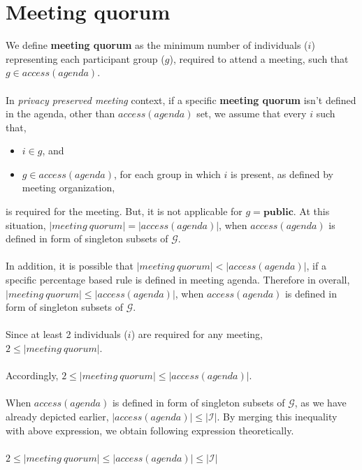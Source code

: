 \documentclass{article}
\begin{document}
\section{Meeting quorum}
\noindent
We define \textbf{meeting quorum} as the minimum number of individuals ($i$) representing each participant group ($g$), required to attend a meeting, such that $g \in access(agenda)$. \\ \\
In \textit{privacy preserved meeting} context, if a specific \textbf{meeting quorum} isn't defined in the agenda, other than $access(agenda)$ set, we assume that every $i$ such that, 
\begin{itemize}
    \item $i \in g$, and
    \item $g \in access(agenda)$, for each group in which $i$ is present, as defined by meeting organization,
\end{itemize}
\noindent
is required for the meeting. But, it is not applicable for $g = \textbf{public}$. At this situation, $|meeting\ quorum| = |access(agenda)|$, when $access(agenda)$ is defined in form of singleton subsets of $\mathcal{G}$. \\ \\
\noindent
In addition, it is possible that $|meeting\ quorum| < |access(agenda)|$, if a specific percentage based rule is defined in meeting agenda. Therefore in overall, $|meeting\ quorum| \leq |access(agenda)|$, when $access(agenda)$ is defined in form of singleton subsets of $\mathcal{G}$. \\ \\
Since at least 2 individuals ($i$) are required for any meeting, $2 \leq |meeting\ quorum|$. \\ \\
Accordingly, $2 \leq |meeting\ quorum| \leq |access(agenda)|$. \\ \\
When $access(agenda)$ is defined in form of singleton subsets of $\mathcal{G}$, as we have already depicted earlier, $|access(agenda)| \leq |\mathcal{I}|$. By merging this inequality with above expression, we obtain following expression theoretically.\\ \\
$2 \leq |meeting\ quorum| \leq |access(agenda)| \leq |\mathcal{I}|$  \\ \\
\end{document}
